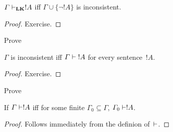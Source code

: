 \documentclass[../../include/open-logic-section]{subfiles}
\begin{document}
\begin{prop} 
$\Gamma \Proves[\Log{LK}] !A$ iff $\Gamma \cup \{\lnot !A\}$ is inconsistent.
\end{prop}

\begin{proof}
Exercise.
\end{proof}

\begin{prob}
Prove 
\end{prob}

\begin{prop}
$\Gamma$ is inconsistent iff $\Gamma \Proves {!A}$ for every
  sentence~$!A$.
\end{prop}

\begin{proof}
Exercise.
\end{proof}

\begin{prob}
Prove 
\end{prob}

\begin{prop}
If $\Gamma \Proves !A$ iff for some finite $\Gamma_0 \subseteq
\Gamma$, $\Gamma_0 \Proves !A$.
\end{prop}

\begin{proof}
Follows immediately from the definion of~$\Proves$.
\end{proof}
\end{document}
